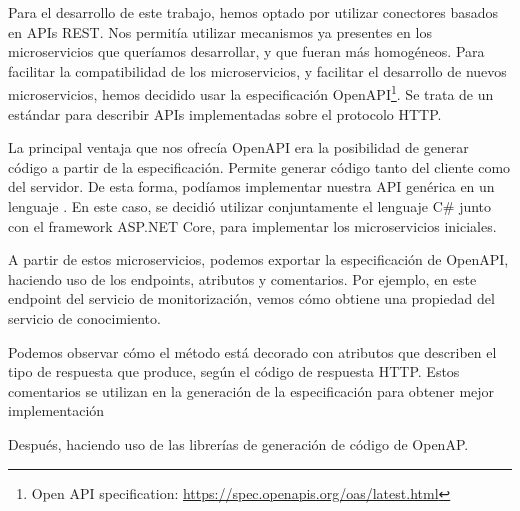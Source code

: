 Para el desarrollo de este trabajo, hemos optado por utilizar conectores basados en APIs REST. Nos permitía utilizar mecanismos ya presentes en los microservicios que queríamos desarrollar, y que fueran más homogéneos.
Para facilitar la compatibilidad de los microservicios, y facilitar el desarrollo de nuevos microservicios, hemos decidido usar la especificación OpenAPI\footnote{Open API specification: \url{https://spec.openapis.org/oas/latest.html}}. Se trata de un estándar para describir APIs implementadas sobre el protocolo HTTP.

La principal ventaja que nos ofrecía OpenAPI era la posibilidad de generar código a partir de la especificación. Permite generar código tanto del cliente como del servidor. De esta forma, podíamos implementar nuestra API genérica en un lenguaje . En este caso, se decidió utilizar conjuntamente el lenguaje C\# junto con el framework ASP.NET Core, para implementar los microservicios iniciales.

A partir de estos microservicios, podemos exportar la especificación de OpenAPI, haciendo uso de los endpoints, atributos y comentarios. Por ejemplo, en este endpoint del servicio de monitorización, vemos cómo obtiene una propiedad del servicio de conocimiento.

Podemos observar cómo el método está decorado con atributos que describen el tipo de respuesta que produce, según el código de respuesta HTTP. Estos comentarios se utilizan en la generación de la especificación para obtener mejor implementación

Después, haciendo uso de las librerías de generación de código de OpenAP.
